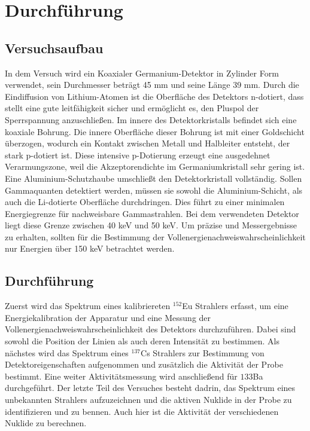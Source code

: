 \section{Durchführung}
\label{sec:Durchführung und Aufbau }
\subsection{Versuchsaufbau}

In dem Versuch wird ein Koaxialer Germanium-Detektor in Zylinder Form verwendet, sein Durchmesser beträgt 45 mm und
seine Länge 39 mm. Durch die Eindiffusion von Lithium-Atomen ist die Oberfläche des Detektors n-dotiert, dass stellt
eine gute leitfähigkeit sicher und ermöglicht es, den Pluspol der Sperrspannung anzuschließen.
Im innere des Detektorkristalls befindet sich eine koaxiale Bohrung. Die innere Oberfläche dieser Bohrung ist mit einer 
Goldschicht überzogen, wodurch ein Kontakt zwischen Metall und Halbleiter entsteht, der stark p-dotiert ist. Diese 
intensive p-Dotierung erzeugt eine ausgedehnet Verarmungszone, weil die Akzeptorendichte im Germaniumkristall sehr gering ist.
Eine Aluminium-Schutzhaube umschließt den Detektorkristall vollständig. Sollen Gammaquanten detektiert werden, müssen sie sowohl 
die Aluminium-Schicht, als auch die Li-dotierte Oberfläche durchdringen. Dies führt zu einer minimalen Energiegrenze für nachweisbare
Gammastrahlen. Bei dem verwendeten Detektor liegt diese Grenze zwischen 40 keV und 50 keV. Um präzise und Messergebnisse zu erhalten, 
sollten für die Bestimmung der Vollenergienachweiswahrscheinlichkeit nur Energien über 150 keV betrachtet werden.


\subsection{Durchführung}
Zuerst wird das Spektrum eines kalibriereten $^{152}$Eu Strahlers erfasst, um eine Energiekalibration der Apparatur und eine Messung der
Vollenergienachweiswahrscheinlichkeit des Detektors durchzuführen. Dabei sind sowohl die Position der Linien als auch deren Intensität zu bestimmen.
Als nächstes wird das Spektrum eines $^{137} $Cs Strahlers zur Bestimmung von Detektoreigenschaften aufgenommen und zusätzlich die Aktivität der Probe
bestimmt. Eine weiter Aktivitätsmessung wird anschließend für ${133}$Ba durchgeführt. Der letzte Teil des Versuches besteht dadrin, das Spektrum eines
unbekannten Strahlers aufzuzeichnen und die aktiven Nuklide in der Probe zu identifizieren und zu bennen. Auch hier ist die Aktivität der 
verschiedenen Nuklide zu berechnen.



